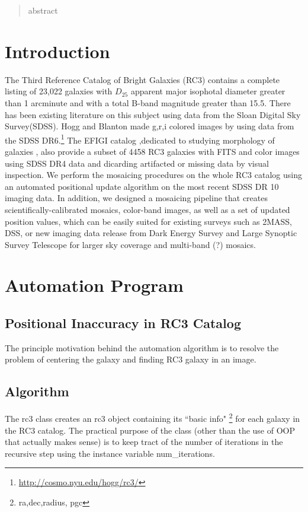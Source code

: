 \documentclass[5p]{elsarticle}
\begin{document}
\begin{abstract}
abstract
\end{abstract}


\section{Introduction}
The Third Reference Catalog of Bright Galaxies (RC3) \cite{rc3} contains a  complete listing of 23,022 galaxies with $D_25$ apparent major isophotal diameter  greater than 1 arcminute and with a total B-band magnitude greater than 15.5. There has been existing literature on this subject using data from the Sloan Digital Sky Survey(SDSS). Hogg and Blanton made g,r,i colored images by using data from the SDSS DR6.\footnote{\url{http://cosmo.nyu.edu/hogg/rc3/}} The EFIGI catalog \cite{efigi},dedicated to studying morphology of galaxies , also  provide a subset of 4458 RC3 galaxies with FITS and color images using SDSS DR4 data and dicarding artifacted or missing data by visual inspection. We perform the mosaicing procedures on the whole RC3 catalog using  an automated positional update algorithm  on the most recent SDSS DR 10 imaging data. In addition, we designed a mosaicing pipeline that creates scientifically-calibrated mosaics, color-band images, as well as a set of updated position values, which can be easily suited for  existing surveys such as 2MASS, DSS, or  new imaging data release from  Dark Energy Survey and Large Synoptic Survey Telescope for larger sky coverage and multi-band (?) mosaics.
\section{Automation Program}
	\subsection{Positional Inaccuracy in RC3 Catalog}
	The principle motivation behind the automation algorithm is to resolve the problem of centering the galaxy and finding RC3 galaxy in an image.
	\subsection{Algorithm}
	The rc3 class creates an rc3 object containing its ``basic info" \footnote{ ra,dec,radius, pgc} for each galaxy in the RC3 catalog. The practical purpose of the class (other than the use of OOP that actually makes sense) is to keep tract of the number of iterations in the recursive step using the instance variable num\_iterations. 
\end{document}
